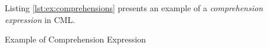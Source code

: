 Listing \ref{lst:ex:comprehensions} presents an example of
a \emph{comprehension expression} in CML.

\begin{code}[H]
\verbatimfont{\small}

\caption{Example of Comprehension Expression}
\label{lst:ex:comprehensions}
\end{code}
